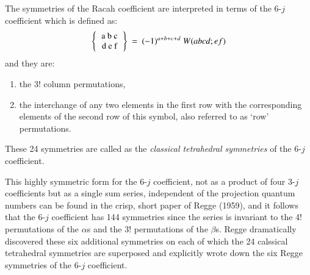 The symmetries of the Racah coefficient are interpreted in terms of the 6-$j$ coefficient which is defined as:
\begin{equation}
\left\{\begin{tabular} {c} 
a\ b\ c\\ 
d\ e\ f \\ 
\end{tabular} \right\} 
\ =\ (-1)^{a+b+c+d}\ W(abcd;ef) \label{chap29-eq28}
\end{equation}
and they are:
\begin{enumerate}
\item the 3! column permutations,
\item the interchange of any two elements in the first row with the corresponding elements of the second row of this symbol, also referred to as `row' permutations.
\end{enumerate}

These 24 symmetries are called as the \textit{classical tetrahedral symmetries} of the 6-$j$ coefficient.

This highly symmetric form for the 6-$j$ coefficient, not as a product of four 3-$j$ coefficients but as a single sum series, independent of the projection quantum numbers can be found in the crisp, short paper of Regge (1959), and it follows that the 6-$j$ coefficient has 144 symmetries since the series is invariant to the 4! permutations of the $\alpha$s and the 3! permutations of the $\beta$s. Regge dramatically discovered these six additional symmetries on each of which the 24 calssical tetrahedral symmetries are superposed and explicitly wrote down the six Regge symmetries of the 6-$j$ coefficient.

